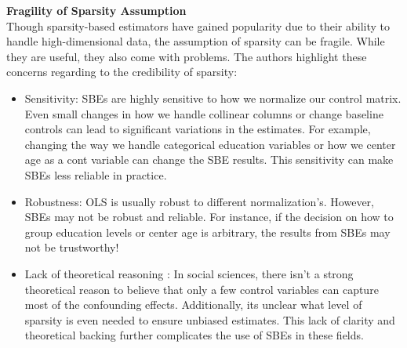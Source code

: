 \textbf{Fragility of Sparsity Assumption}\\
Though sparsity-based estimators have gained popularity due to their ability to handle high-dimensional data, the assumption of sparsity can be fragile. While they are useful, they also come with problems. The authors highlight these concerns regarding to the credibility of sparsity:
\begin{itemize}
    \item Sensitivity: SBEs are highly sensitive to how we normalize our control matrix. Even small changes in how we handle collinear columns or change baseline controls can lead to significant variations in the estimates. For example, changing the way we handle categorical {education } variables or how we center age as a cont variable can change the SBE results. This sensitivity can make SBEs less reliable in practice.
    \item Robustness: OLS is usually robust to different normalization's. However, SBEs may not be robust and reliable. For instance, if the decision on how to group education levels or center age is arbitrary, the results from SBEs may not be trustworthy!
    \item Lack of theoretical reasoning : In social sciences, there isn't a strong theoretical reason to believe that only a few control variables can capture most of the confounding effects. Additionally, its unclear what level of sparsity is even needed to ensure unbiased estimates. This lack of clarity and theoretical backing further complicates the use of SBEs in these fields.
\end{itemize}






